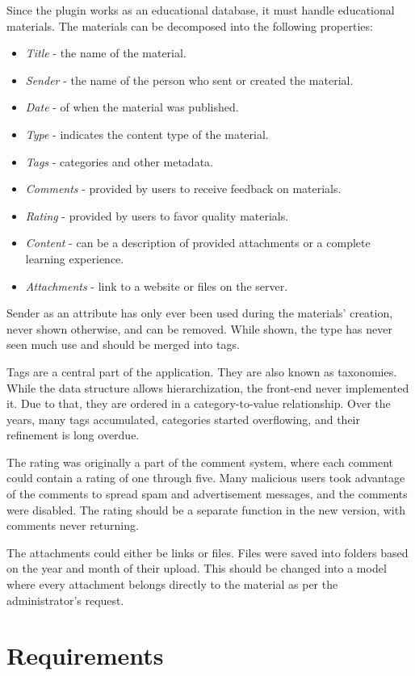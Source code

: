 \documentclass[
  digital,     %
  oneside,     %
  nosansbold,  %
  colorbold, %
  lof,         %
  lot,         %
]{fithesis4}
\begin{document}
Since the plugin works as an educational database, it must handle educational materials. The materials can be decomposed into the following properties: \begin{itemize}
	\item \textit{Title} - the name of the material.
	\item \textit{Sender} - the name of the person who sent or created the material.
	\item \textit{Date} - of when the material was published.
	\item \textit{Type} - indicates the content type of the material.
	\item \textit{Tags} - categories and other metadata.
	\item \textit{Comments} - provided by users to receive feedback on materials.
	\item \textit{Rating} - provided by users to favor quality materials.
	\item \textit{Content} - can be a description of provided attachments or a complete learning experience.
	\item \textit{Attachments} - link to a website or files on the server.
\end{itemize}

Sender as an attribute has only ever been used during the materials' creation, never shown otherwise, and can be removed. While shown, the type has never seen much use and should be merged into tags.

Tags are a central part of the application. They are also known as taxonomies. While the data structure allows hierarchization, the front-end never implemented it. Due to that, they are ordered in a category-to-value relationship. Over the years, many tags accumulated, categories started overflowing, and their refinement is long overdue.

The rating was originally a part of the comment system, where each comment could contain a rating of one through five. Many malicious users took advantage of the comments to spread spam and advertisement messages, and the comments were disabled. The rating should be a separate function in the new version, with comments never returning.

The attachments could either be links or files. Files were saved into folders based on the year and month of their upload. This should be changed into a model where every attachment belongs directly to the material as per the administrator's request.

\section{Requirements}
\end{document}
